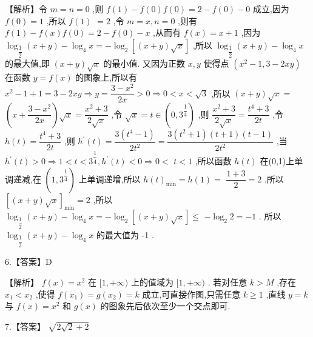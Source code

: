 \documentclass[10pt]{article}
\begin{document}
【解析】令 $m = n = 0$ ,则 $f\left( 1\right)  - f\left( 0\right) f\left( 0\right)  = 2 - f\left( 0\right)  - 0$ 成立,因为 $f\left( 0\right)  = 1$ ,所以 $f\left( 1\right)$  $= 2$ ,令 $m = x,n = 0$ ,则有 $f\left( 1\right)  - f\left( x\right) f\left( 0\right)  = 2 - f\left( 0\right)  - x$ ,从而有 $f\left( x\right)  = x + 1$ ,因为 ${\log }_{\dfrac{1}{2}}\left( {x + y}\right)  - {\log }_{4}x =  - {\log }_{2}\left\lbrack  {\left( {x + y}\right) \sqrt{x}}\right\rbrack$ ,所以 ${\log }_{\dfrac{1}{2}}\left( {x + y}\right)  - {\log }_{4}x$ 的最大值,即 $\left( {x + y}\right) \sqrt{x}$ 的最小值. 又因为正数 $x,y$ 使得点 $\left( {{x}^{2} - 1,3 - {2xy}}\right)$ 在函数 $y = f\left( x\right)$ 的图象上,所以有 ${x}^{2} - 1 + 1 = 3 - {2xy} \Rightarrow  y = \dfrac{3 - {x}^{2}}{2x} > 0 \Rightarrow  0 < x < \sqrt{3}$ ,所以 $\left( {x + y}\right) \sqrt{x} =$  $\left( {x + \dfrac{3 - {x}^{2}}{2x}}\right) \sqrt{x} = \dfrac{{x}^{2} + 3}{2\sqrt{x}}$ ,令 $\sqrt{x} = t \in  \left( {0,{3}^{\dfrac{1}{4}}}\right)$ ,则 $\dfrac{{x}^{2} + 3}{2\sqrt{x}} = \dfrac{{t}^{4} + 3}{2t}$ ,令 $h\left( t\right)  = \dfrac{{t}^{4} + 3}{2t}$ ,则 ${h}^{\prime }\left( t\right)  = \dfrac{3\left( {{t}^{4} - 1}\right) }{2{t}^{2}} = \dfrac{3\left( {{t}^{2} + 1}\right) \left( {t + 1}\right) \left( {t - 1}\right) }{2{t}^{2}}$ ,当 ${h}^{\prime }\left( t\right)  > 0 \Rightarrow  1 < t < {3}^{\dfrac{1}{4}},{h}^{\prime }\left( t\right)  < 0 \Rightarrow  0 <$  $t < 1$ ,所以函数 $h\left( t\right)$ 在(0,1)上单调递减,在 $\left( {1,{3}^{\dfrac{1}{4}}}\right)$ 上单调递增,所以 $h{\left( t\right) }_{\min } = h\left( 1\right)  =$  $\dfrac{1 + 3}{2} = 2$ ,所以 ${\left\lbrack  \left( x + y\right) \sqrt{x}\right\rbrack  }_{\min } = 2$ ,所以 ${\log }_{\dfrac{1}{2}}\left( {x + y}\right)  - {\log }_{4}x =  - {\log }_{2}\left\lbrack  {\left( {x + y}\right) \sqrt{x}}\right\rbrack   \leq$  $- {\log }_{2}2 =  - 1$ . 所以 ${\log }_{\dfrac{1}{2}}\left( {x + y}\right)  - {\log }_{4}x$ 的最大值为 -1 .

6.【答案】D

【解析】 $f\left( x\right)  = {x}^{2}$ 在 $\lbrack 1, + \infty )$ 上的值域为 $\lbrack 1, + \infty )$ . 若对任意 $k > M$ ,存在 ${x}_{1} < {x}_{2}$ ,使得 $f\left( {x}_{1}\right)  = g\left( {x}_{2}\right)  = k$ 成立,可直接作图,只需任意 $k \geq  1$ ,直线 $y = k$ 与 $f\left( x\right)  = {x}^{2}$ 和 $g\left( x\right)$ 的图象先后依次至少一个交点即可.

7.【答案】 $\sqrt{2\sqrt{2} + 2}$
\end{document}
